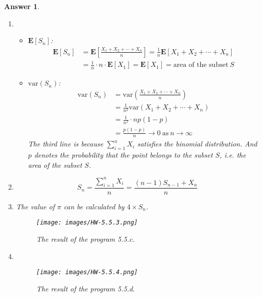 \documentclass[utf8]{article}
\theoremstyle{definition}%
\theoremstyle{plain}%
\newtheorem{answer}{Answer} %
\begin{document}
\begin{answer} ~ 
    \begin{enumerate}[label=(\alph*)]
        \item \begin{itemize}
            \item $\mathbf{E}[S_n]$:
            \begin{equation}
            \begin{aligned}
                \mathbf{E}[S_n] &= \mathbf{E}\left[\frac{X_1 + X_2 + \cdots + X_n}{n}\right] = \frac{1}{n} \mathbf{E}[X_1 + X_2 + \cdots + X_n] \\ 
                &= \frac{1}{n} \cdot n \cdot \mathbf{E}[X_1] = \mathbf{E}[X_1] = \text{area of the subset}~S
            \end{aligned}
            \end{equation}
            \item $\text{var}(S_n)$:
            \begin{equation}
            \begin{aligned}
                \text{var}(S_n) &= \text{var}\left(\frac{X_1 + X_2 + \cdots + X_n}{n}\right) \\ 
                & = \frac{1}{n^2} \text{var}(X_1 + X_2 + \cdots + X_n) \\ 
                &= \frac{1}{n^2} \cdot np(1-p) \\ 
                &= \frac{p(1-p)}{n} \rightarrow 0 ~\text{as}~ n \rightarrow \infty
            \end{aligned}
            \end{equation}
            The third line is because $\sum_{i=1}^{n} X_i$ satisfies the binomial distribution. And $p$ denotes the probability that the point belongs to the subset $S$, i.e. the area of the subset $S$.
        \end{itemize}    
        \item \begin{equation}
                S_n = \frac{\sum_{i=1}^{n} X_i}{n} = \frac{(n-1)S_{n-1} + X_n}{n}
        \end{equation}
        \item The value of $\pi$ can be calculated by $4 \times S_n$.
        \begin{figure}[H]
            \centering
            \texttt{[image: images/HW-5.5.3.png]}
            \caption{The result of the program 5.5.c.}
        \end{figure}
        \item ~
        \begin{figure}[H]
            \centering
            \texttt{[image: images/HW-5.5.4.png]}
            \caption{The result of the program 5.5.d.}
        \end{figure}
    \end{enumerate}
\end{answer}
\end{document}
